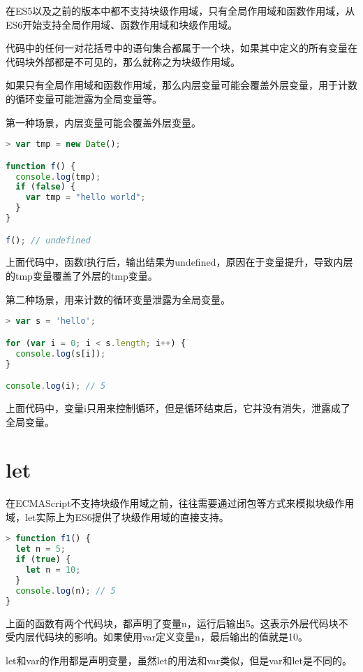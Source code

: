 在ES5以及之前的版本中都不支持块级作用域，只有全局作用域和函数作用域，从ES6开始支持全局作用域、函数作用域和块级作用域。



代码中的任何一对花括号中的语句集合都属于一个块，如果其中定义的所有变量在代码块外部都是不可见的，那么就称之为块级作用域。

如果只有全局作用域和函数作用域，那么内层变量可能会覆盖外层变量，用于计数的循环变量可能泄露为全局变量等。

第一种场景，内层变量可能会覆盖外层变量。



\begin{lstlisting}[language=JavaScript]
> var tmp = new Date();

function f() {
  console.log(tmp);
  if (false) {
    var tmp = "hello world";
  }
}

f(); // undefined
\end{lstlisting}

上面代码中，函数f执行后，输出结果为undefined，原因在于变量提升，导致内层的tmp变量覆盖了外层的tmp变量。

第二种场景，用来计数的循环变量泄露为全局变量。

\begin{lstlisting}[language=JavaScript]
> var s = 'hello';

for (var i = 0; i < s.length; i++) {
  console.log(s[i]);
}

console.log(i); // 5
\end{lstlisting}

上面代码中，变量i只用来控制循环，但是循环结束后，它并没有消失，泄露成了全局变量。

\section{let}


在ECMAScript不支持块级作用域之前，往往需要通过闭包等方式来模拟块级作用域，let实际上为ES6提供了块级作用域的直接支持。

\begin{lstlisting}[language=JavaScript]
> function f1() {
  let n = 5;
  if (true) {
    let n = 10;
  }
  console.log(n); // 5
}
\end{lstlisting}

上面的函数有两个代码块，都声明了变量n，运行后输出5。这表示外层代码块不受内层代码块的影响。如果使用var定义变量n，最后输出的值就是10。


let和var的作用都是声明变量，虽然let的用法和var类似，但是var和let是不同的。

